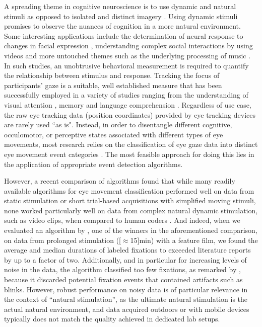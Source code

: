 A spreading theme in cognitive neuroscience is to use dynamic and natural
stimuli as opposed to isolated and distinct imagery \citep{real_world}. Using
dynamic stimuli promises to observe the nuances of cognition in a more natural
environment. Some interesting applications include the determination of neural
response to changes in facial expression \citep{Harris2014}, understanding
complex social interactions by using videos \citep{Tikka2012} and more
untouched themes such as the underlying processing of music
\citep{Toiviainen2014}. In such studies, an unobtrusive behavioral measurement
is required to quantify the relationship between stimulus and response.
Tracking the focus of participants' gaze is a suitable, well established
measure that has been successfully employed in a variety of studies ranging
from the understanding of visual attention \citep{HantaoLiu2011}, memory
\citep{Hannula2010} and language comprehension \citep{Gordon2006}.
%
Regardless of use case, the raw eye tracking data (position coordinates)
provided by eye tracking devices are rarely used ``as is". Instead, in order
to disentangle different cognitive, occulomotor, or perceptive states
associated with different types of eye movements, most research relies on the
classification of eye gaze data into distinct eye movement event categories
\citep{Schutz2011}. The most feasible approach for doing this lies in the
application of appropriate event detection algorithms.

However, a recent comparison of algorithms found that while many readily
available algorithms for eye movement classification performed well on data
from static stimulation or short trial-based acquisitions with simplified
moving stimuli, none worked particularly well on data from complex natural
dynamic stimulation, such as video clips, when compared to human coders
\citep{Andersson2017}.
%
And indeed, when we evaluated an algorithm by \citet{Nystrom2010AnData}, one of
the winners in the aforementioned comparison, on data from prolonged
stimulation (\unit[$\approx$15]{min}) with a feature film, we found the
average and median durations of labeled fixations to exceeded literature
reports \citep[\eg][]{holmqvist2011eye,dorr2010variability} by up to a factor
of two.  Additionally, and in particular for increasing levels of noise in the
data, the algorithm classified too few fixations, as remarked by
\citet{Friedman2018}, because it discarded potential fixation events that
contained artifacts such as blinks.
%
However, robust performance on noisy data is of particular relevance in the
context of ``natural stimulation'', as the ultimate natural stimulation is the
actual natural environment, and data acquired outdoors or with mobile
devices typically does not match the quality achieved in dedicated lab
setups.

